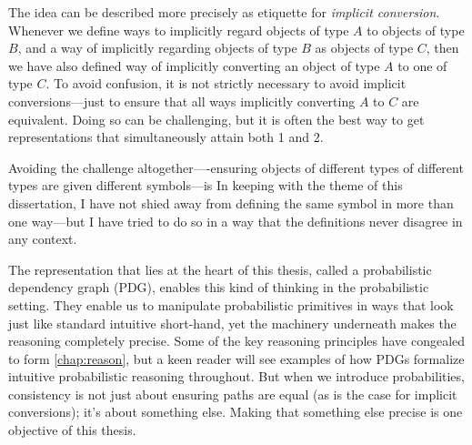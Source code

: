 The idea can be described more precisely as etiquette for \emph{implicit conversion}.
Whenever we define ways to implicitly regard objects of type $A$ to objects of type $B$, and a way of implicitly regarding objects of type
    $B$ as objects of type $C$, then 
    we have also defined way of implicitly converting an object of type $A$ to one of type $C$.
%
To avoid confusion, it is not strictly necessary to avoid implicit conversions---just to ensure that all ways implicitly converting $A$ to $C$ are equivalent. 
%
Doing so can be challenging, but it is often the best way to get representations that simultaneously attain both 1 and 2. 
%

Avoiding the challenge altogether----ensuring objects of different types of different types are given different symbols---is 
%
%
In keeping with the theme of this dissertation, I have not shied away from defining the same symbol in more than one way---but I have tried to do so in a way that the definitions never disagree in any context. 
%

    

The representation that lies at the heart of this thesis, called a probabilistic dependency graph (PDG), enables this kind of thinking in the probabilistic setting.
They enable us to manipulate probabilistic primitives in ways that look just like standard intuitive short-hand, yet the machinery underneath makes the reasoning completely precise.
Some of the key reasoning principles have congealed to form \cref{chap:reason},
but a keen reader will see examples of how PDGs formalize intuitive probabilistic reasoning throughout. 
But when we introduce probabilities, consistency is not just about ensuring paths are equal 
    (as is the case for implicit conversions); it's about something else. 
Making that something else precise is one objective of this thesis. 
%


